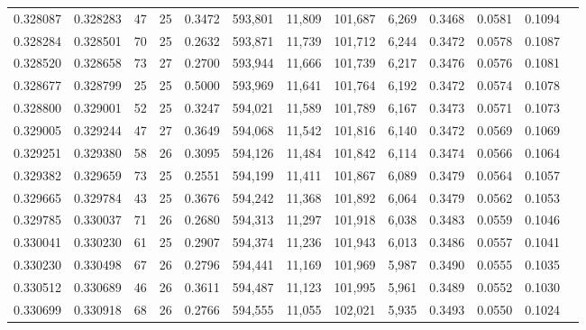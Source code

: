 \begin{tabular}{rrrrrrrrrrrrr}
0.328087 & 0.328283 &  47 &  25 &                                     0.3472 & 593,801 &  11,809 & 101,687 &   6,269 & 0.3468 & 0.0581 & 0.1094 \\
0.328284 & 0.328501 &  70 &  25 &                                     0.2632 & 593,871 &  11,739 & 101,712 &   6,244 & 0.3472 & 0.0578 & 0.1087 \\
0.328520 & 0.328658 &  73 &  27 &                                     0.2700 & 593,944 &  11,666 & 101,739 &   6,217 & 0.3476 & 0.0576 & 0.1081 \\
0.328677 & 0.328799 &  25 &  25 &                                     0.5000 & 593,969 &  11,641 & 101,764 &   6,192 & 0.3472 & 0.0574 & 0.1078 \\
0.328800 & 0.329001 &  52 &  25 &                                     0.3247 & 594,021 &  11,589 & 101,789 &   6,167 & 0.3473 & 0.0571 & 0.1073 \\
0.329005 & 0.329244 &  47 &  27 &                                     0.3649 & 594,068 &  11,542 & 101,816 &   6,140 & 0.3472 & 0.0569 & 0.1069 \\
0.329251 & 0.329380 &  58 &  26 &                                     0.3095 & 594,126 &  11,484 & 101,842 &   6,114 & 0.3474 & 0.0566 & 0.1064 \\
0.329382 & 0.329659 &  73 &  25 &                                     0.2551 & 594,199 &  11,411 & 101,867 &   6,089 & 0.3479 & 0.0564 & 0.1057 \\
0.329665 & 0.329784 &  43 &  25 &                                     0.3676 & 594,242 &  11,368 & 101,892 &   6,064 & 0.3479 & 0.0562 & 0.1053 \\
0.329785 & 0.330037 &  71 &  26 &                                     0.2680 & 594,313 &  11,297 & 101,918 &   6,038 & 0.3483 & 0.0559 & 0.1046 \\
0.330041 & 0.330230 &  61 &  25 &                                     0.2907 & 594,374 &  11,236 & 101,943 &   6,013 & 0.3486 & 0.0557 & 0.1041 \\
0.330230 & 0.330498 &  67 &  26 &                                     0.2796 & 594,441 &  11,169 & 101,969 &   5,987 & 0.3490 & 0.0555 & 0.1035 \\
0.330512 & 0.330689 &  46 &  26 &                                     0.3611 & 594,487 &  11,123 & 101,995 &   5,961 & 0.3489 & 0.0552 & 0.1030 \\
0.330699 & 0.330918 &  68 &  26 &                                     0.2766 & 594,555 &  11,055 & 102,021 &   5,935 & 0.3493 & 0.0550 & 0.1024 \\

\end{tabular}
